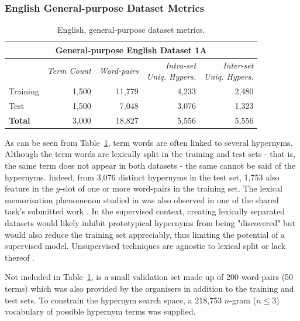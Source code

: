 \subsubsection{English General-purpose Dataset Metrics}
\begin{table}\centering
    \begin{tabular}{@{}lrrrr@{}} \toprule
    \multicolumn{5}{c}{\textbf{General-purpose English Dataset 1A}} \\ \midrule
    & \textit{Term Count} & \textit{Word-pairs} & \shortstack[r]{\textit{Intra-set}\\\textit{Uniq. Hypers.}} & \shortstack[r]{\textit{Inter-set}\\\textit{Uniq. Hypers.}} \\ \midrule
    Training & 1,500 & 11,779 & 4,233 & 2,480 \\
    Test & 1,500 & 7,048 & 3,076 & 1,323 \\ \midrule
    \textbf{Total} & 3,000 & 18,827 & 5,556 & 5,556 \\
    \bottomrule
    \end{tabular}
    \caption{English, general-purpose dataset metrics.}\label{tab:semeval_english_dataset_metrics}
\end{table}
As can be seen from Table~\ref{tab:semeval_english_dataset_metrics}, term words are often linked to several hypernyms.  Although the term words are lexically split in the training and test sets - that is, the same term does not appear in both datasets - the same cannot be said of the hypernyms.  Indeed, from 3,076 distinct hypernyms in the test set, 1,753 also feature in the $y$-slot of one or more word-pairs in the training set.  The lexical memorisation phenomenon studied in \citep{levy2015supervised} was also observed in one of the shared task's submitted work \citep{bernier2018crim}.  In the supervised context, creating lexically separated datasets would likely inhibit prototypical hypernyms from being "discovered" but would also reduce the training set appreciably, thus limiting the potential of a supervised model.  Unsupervised techniques are agnostic to lexical split or lack thereof \citep{shwartz2017siege}.

Not included in Table~\ref{tab:semeval_english_dataset_metrics}, is a small validation set made up of 200 word-pairs (50 terms) which was also provided by the organisers in addition to the training and test sets.  To constrain the hypernym search space, a 218,753 $n$-gram ($n \leq 3$) vocabulary of possible hypernym terms was supplied.  

